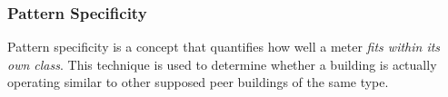 \subsubsection{Pattern Specificity}
\label{sec:patternspec}

Pattern specificity is a concept that quantifies how well a meter \emph{fits within its own class}. This technique is used to determine whether a building is actually operating similar to other supposed peer buildings of the same type.